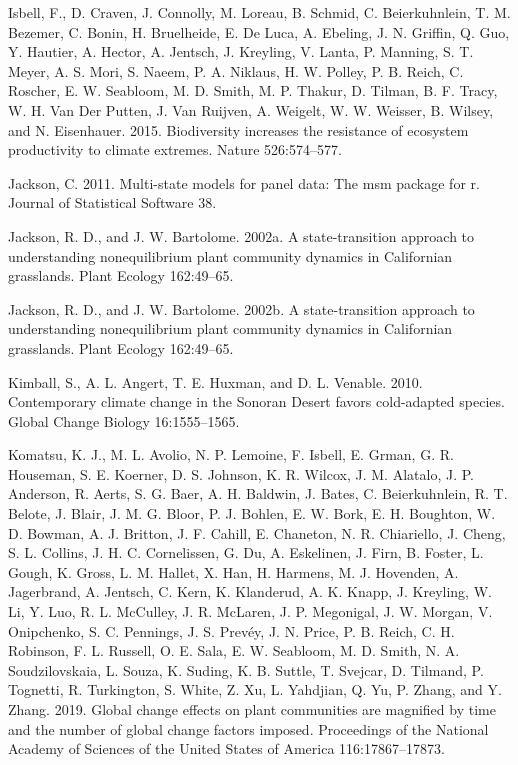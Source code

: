\documentclass[twoside,12pt,final]{ucthesis-CA2012}
\begin{document}
\begin{ucmainmatter}
\leavevmode\hypertarget{ref-Isbell2015}{}%
Isbell, F., D. Craven, J. Connolly, M. Loreau, B. Schmid, C. Beierkuhnlein, T. M. Bezemer, C. Bonin, H. Bruelheide, E. De Luca, A. Ebeling, J. N. Griffin, Q. Guo, Y. Hautier, A. Hector, A. Jentsch, J. Kreyling, V. Lanta, P. Manning, S. T. Meyer, A. S. Mori, S. Naeem, P. A. Niklaus, H. W. Polley, P. B. Reich, C. Roscher, E. W. Seabloom, M. D. Smith, M. P. Thakur, D. Tilman, B. F. Tracy, W. H. Van Der Putten, J. Van Ruijven, A. Weigelt, W. W. Weisser, B. Wilsey, and N. Eisenhauer. 2015. Biodiversity increases the resistance of ecosystem productivity to climate extremes. Nature 526:574--577.

\leavevmode\hypertarget{ref-Jackson2011}{}%
Jackson, C. 2011. Multi-state models for panel data: The msm package for r. Journal of Statistical Software 38.

\leavevmode\hypertarget{ref-Jackson2002a}{}%
Jackson, R. D., and J. W. Bartolome. 2002a. A state-transition approach to understanding nonequilibrium plant community dynamics in Californian grasslands. Plant Ecology 162:49--65.

\leavevmode\hypertarget{ref-Jackson2002}{}%
Jackson, R. D., and J. W. Bartolome. 2002b. A state-transition approach to understanding nonequilibrium plant community dynamics in Californian grasslands. Plant Ecology 162:49--65.

\leavevmode\hypertarget{ref-Kimball2010}{}%
Kimball, S., A. L. Angert, T. E. Huxman, and D. L. Venable. 2010. Contemporary climate change in the Sonoran Desert favors cold-adapted species. Global Change Biology 16:1555--1565.

\leavevmode\hypertarget{ref-Komatsu2019}{}%
Komatsu, K. J., M. L. Avolio, N. P. Lemoine, F. Isbell, E. Grman, G. R. Houseman, S. E. Koerner, D. S. Johnson, K. R. Wilcox, J. M. Alatalo, J. P. Anderson, R. Aerts, S. G. Baer, A. H. Baldwin, J. Bates, C. Beierkuhnlein, R. T. Belote, J. Blair, J. M. G. Bloor, P. J. Bohlen, E. W. Bork, E. H. Boughton, W. D. Bowman, A. J. Britton, J. F. Cahill, E. Chaneton, N. R. Chiariello, J. Cheng, S. L. Collins, J. H. C. Cornelissen, G. Du, A. Eskelinen, J. Firn, B. Foster, L. Gough, K. Gross, L. M. Hallet, X. Han, H. Harmens, M. J. Hovenden, A. Jagerbrand, A. Jentsch, C. Kern, K. Klanderud, A. K. Knapp, J. Kreyling, W. Li, Y. Luo, R. L. McCulley, J. R. McLaren, J. P. Megonigal, J. W. Morgan, V. Onipchenko, S. C. Pennings, J. S. Prevéy, J. N. Price, P. B. Reich, C. H. Robinson, F. L. Russell, O. E. Sala, E. W. Seabloom, M. D. Smith, N. A. Soudzilovskaia, L. Souza, K. Suding, K. B. Suttle, T. Svejcar, D. Tilmand, P. Tognetti, R. Turkington, S. White, Z. Xu, L. Yahdjian, Q. Yu, P. Zhang, and Y. Zhang. 2019. Global change effects on plant communities are magnified by time and the number of global change factors imposed. Proceedings of the National Academy of Sciences of the United States of America 116:17867--17873.


\end{ucmainmatter}
\end{document}
